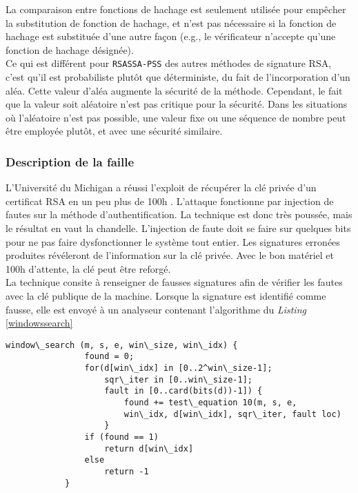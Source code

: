 La comparaison entre fonctions de hachage est seulement utilisée pour empêcher la substitution de fonction de hachage, et n'est pas nécessaire si la fonction de hachage est substituée d'une autre façon (e.g., le vérificateur n'accepte qu'une fonction de hachage désignée).\\ 


Ce qui est différent pour \texttt{RSASSA-PSS} des autres méthodes de signature RSA, c'est qu'il est probabiliste plutôt que déterministe, du fait de  l'incorporation d'un aléa. Cette valeur d'aléa augmente la sécurité de la méthode. Cependant, le fait que la valeur soit aléatoire n'est pas critique pour la sécurité. Dans les situations où l'aléatoire n'est pas possible, une valeur fixe ou une séquence de nombre peut être employée plutôt, et avec une sécurité similaire.

		\subsubsection{Description de la faille}
		
			L'Université du Michigan a réussi l'exploit de récupérer la clé privée d'un certificat RSA en un peu plus de 100h \cite{andrea2010RSA} \cite{opensslvuln2010}. 	L'attaque fonctionne par injection de fautes \cite{fault2008lawson} sur la méthode d'authentification. La technique est donc très poussée, mais le résultat en vaut la chandelle. L'injection de faute doit se faire sur quelques bits pour ne pas faire dysfonctionner le système tout entier. Les signatures erronées produites révéleront de l'information sur la clé privée. Avec le bon matériel et 100h d'attente, la clé peut être reforgé.\\

			La technique consite à renseigner de fausses signatures afin de vérifier les fautes avec la clé publique de la machine. Lorsque la signature est identifié comme fausse, elle est envoyé à un analyseur contenant l'algorithme du \textit{Listing} \ref{windowssearch}

			\begin{lstlisting}[style=customc,caption=window\_search.c, label=windowssearch]
			window\_search (m, s, e, win\_size, win\_idx) {
				found = 0;
				for(d[win\_idx] in [0..2^win\_size-1];
					sqr\_iter in [0..win\_size-1];
					fault in [0..card(bits(d))-1]) {
						found += test\_equation 10(m, s, e,
						win\_idx, d[win\_idx], sqr\_iter, fault loc)
					}
				if (found == 1) 
					return d[win\_idx]
				else 
					return -1
			}
			\end{lstlisting}

